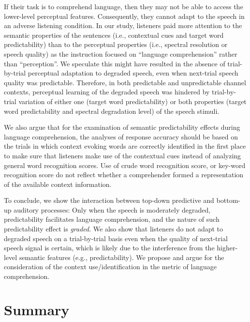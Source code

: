 \documentclass[a4paper, nobind]{templates/ociamthesis}
\begin{document}
If their task is to comprehend language, then they may not be able to access the lower-level perceptual features.
Consequently, they cannot adapt to the speech in an adverse listening condition.
In our study, listeners paid more attention to the semantic properties of the sentences (i.e., contextual cues and target word predictability) than to the perceptual properties (i.e., spectral resolution or speech quality) as the instruction focused on ``language comprehension'' rather than ``perception''.
We speculate this might have resulted in the absence of trial- by-trial perceptual adaptation to degraded speech, even when next-trial speech quality was predictable.
Therefore, in both predictable and unpredictable channel contexts, perceptual learning of the degraded speech was hindered by trial-by-trial variation of either one (target word predictability) or both properties (target word predictability and spectral degradation level) of the speech stimuli.

We also argue that for the examination of semantic predictability effects during language comprehension, the analyses of response accuracy should be based on the trials in which context evoking words are correctly identified in the first place to make sure that listeners make use of the contextual cues instead of analyzing general word recognition scores.
Use of crude word recognition score, or key-word recognition score do not reflect whether a comprehender formed a representation of the available context information.

To conclude, we show the interaction between top-down predictive and bottom-up auditory processes:
Only when the speech is moderately degraded, predictability facilitates language comprehension,
and the nature of such predictability effect is \emph{graded}.
We also show that listeners do not adapt to degraded speech on a trial-by-trial basis even when the quality of next-trial speech signal is certain,
which is likely due to the interference from the higher-level semantic features (e.g., predictability).
We propose and argue for the consideration of the context use/identification in the metric of language comprehension.

\hypertarget{summary-3}{%
\section{Summary}\label{summary-3}}
\end{document}
